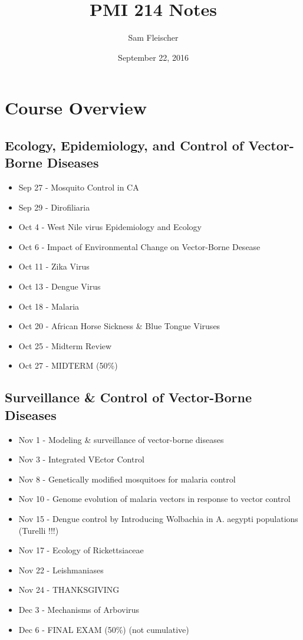 \documentclass{article}
\title{PMI 214 Notes}
\author{Sam Fleischer}
\date{September 22, 2016}
\begin{document}
    \maketitle

    \section*{Course Overview}
        \subsection*{Ecology, Epidemiology, and Control of Vector-Borne Diseases}
            \begin{itemize}
                \item Sep 27 - Mosquito Control in CA
                \item Sep 29 - Dirofiliaria
                \item Oct 4 - West Nile virus Epidemiology and Ecology
                \item Oct 6 - Impact of Environmental Change on Vector-Borne Desease
                \item Oct 11 - Zika Virus
                \item Oct 13 - Dengue Virus
                \item Oct 18 - Malaria
                \item Oct 20 - African Horse Sickness \& Blue Tongue Viruses
                \item Oct 25 - Midterm Review
                \item Oct 27 - MIDTERM (50\%)
            \end{itemize}
        \subsection*{Surveillance \& Control of Vector-Borne Diseases}
            \begin{itemize}
                \item Nov 1 - Modeling \& surveillance of vector-borne diseases
                \item Nov 3 - Integrated VEctor Control
                \item Nov 8 - Genetically modified mosquitoes for malaria control
                \item Nov 10 - Genome evolution of malaria vectors in response to vector control
                \item Nov 15 - Dengue control by Introducing Wolbachia in A. aegypti populations (Turelli !!!)
                \item Nov 17 - Ecology of Rickettsiaceae
                \item Nov 22 - Leishmaniases
                \item Nov 24 - THANKSGIVING
                \item Dec 3 - Mechanisms of Arbovirus
                \item Dec 6 - FINAL EXAM (50\%) (not cumulative)
            \end{itemize}
\end{document}
